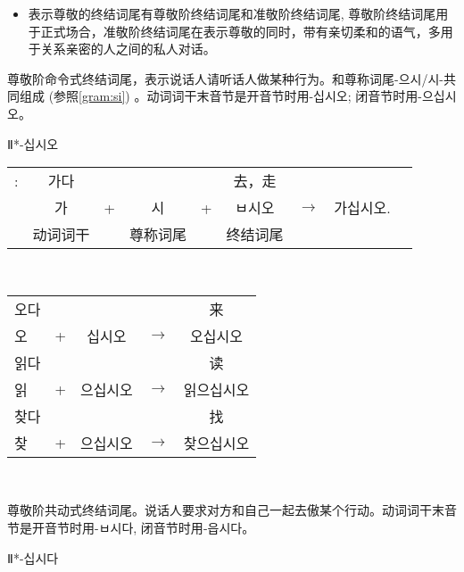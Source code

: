 \begin{grammar}
\begin{grammarsect}[尊敬阶终结词尾]
        \begin{itemize}
            \item 表示尊敬的终结词尾有尊敬阶终结词尾和准敬阶终结词尾, 尊敬阶终结词尾用于正式场合，准敬阶终结词尾在表示尊敬的同时，带有亲切柔和的语气，多用于关系亲密的人之间的私人对话。
        \end{itemize}
    \end{grammarsect}
    \begin{grammarsect}[\kr -ㅂ시오]
        \begin{itemize}
            \item 尊敬阶命令式终结词尾，表示说话人请听话人做某种行为。和尊称词尾{\kr -으시/시-}共同组成 (参照\ref{gram:si}) 。动词词干末音节是开音节时用-십시오;
闭音节时用{\kr -으십시오}。 
            {\color{gray} \item Ⅱ*{\kr -십시오}} 
        \end{itemize}
        \begin{tabular}{ccccccccc}
            \kr \ruby{例}{예}:&\kr 가다&&&&去，走\\
            &\kr 가&+&\kr 시&+&\kr ㅂ시오&$\to$&\kr 가십시오.\\\cline{2-2}\cline{4-4}\cline{6-6}
            &动词词干&&尊称词尾&&终结词尾
        \end{tabular}\\
        \begin{tabular}{lcccc}
            \kr 오다 &&&&来\\
            \kr 오 &+ &\kr 십시오&$\to$&\kr 오십시오\\
            \kr 읽다 &&&&读\\
            \kr 읽 &+&\kr 으십시오&$\to$&\kr 읽으십시오\\
            \kr 찾다 &&&&找 \\
            \kr 찾 &+ &\kr 으십시오&$\to$&\kr 찾으십시오 
        \end{tabular}\\
    \end{grammarsect}
    \begin{grammarsect}[\kr -(으){}ㅂ시다]
        \begin{itemize}
            \item 尊敬阶共动式终结词尾。说话人要求对方和自己一起去傲某个行动。动词词干末音节是开音节时用{\kr -ㅂ시다}, 闭音节时用{\kr -읍시다}。
            {\color{gray} \item Ⅱ*{\kr -십시다}} 
        \end{itemize}
        \begin{tabular}{ccccccc}

\end{tabular}
\end{grammarsect}
\end{grammar}
